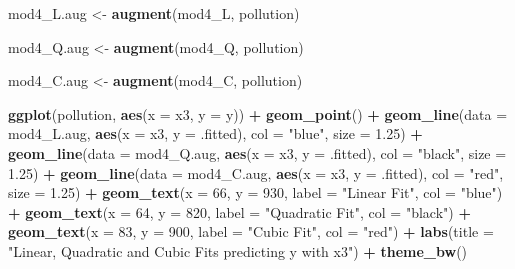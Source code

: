 \documentclass[]{book}
\newenvironment{Shaded}{\begin{snugshade}}{\end{snugshade}}
\newcommand{\KeywordTok}[1]{\textcolor[rgb]{0.13,0.29,0.53}{\textbf{#1}}}
\newcommand{\DataTypeTok}[1]{\textcolor[rgb]{0.13,0.29,0.53}{#1}}
\newcommand{\DecValTok}[1]{\textcolor[rgb]{0.00,0.00,0.81}{#1}}
\newcommand{\FloatTok}[1]{\textcolor[rgb]{0.00,0.00,0.81}{#1}}
\newcommand{\StringTok}[1]{\textcolor[rgb]{0.31,0.60,0.02}{#1}}
\newcommand{\OperatorTok}[1]{\textcolor[rgb]{0.81,0.36,0.00}{\textbf{#1}}}
\newcommand{\NormalTok}[1]{#1}
\theoremstyle{definition}
\theoremstyle{definition}
\theoremstyle{definition}
\theoremstyle{remark}
\begin{document}
\begin{Shaded}
\begin{Highlighting}[]
\NormalTok{mod4_L.aug <-}\StringTok{ }\KeywordTok{augment}\NormalTok{(mod4_L, pollution)}

\NormalTok{mod4_Q.aug <-}\StringTok{ }\KeywordTok{augment}\NormalTok{(mod4_Q, pollution)}

\NormalTok{mod4_C.aug <-}\StringTok{ }\KeywordTok{augment}\NormalTok{(mod4_C, pollution)}

\KeywordTok{ggplot}\NormalTok{(pollution, }\KeywordTok{aes}\NormalTok{(}\DataTypeTok{x =}\NormalTok{ x3, }\DataTypeTok{y =}\NormalTok{ y)) }\OperatorTok{+}
\StringTok{    }\KeywordTok{geom_point}\NormalTok{() }\OperatorTok{+}
\StringTok{    }\KeywordTok{geom_line}\NormalTok{(}\DataTypeTok{data =}\NormalTok{ mod4_L.aug, }\KeywordTok{aes}\NormalTok{(}\DataTypeTok{x =}\NormalTok{ x3, }\DataTypeTok{y =}\NormalTok{ .fitted), }
              \DataTypeTok{col =} \StringTok{"blue"}\NormalTok{, }\DataTypeTok{size =} \FloatTok{1.25}\NormalTok{) }\OperatorTok{+}
\StringTok{    }\KeywordTok{geom_line}\NormalTok{(}\DataTypeTok{data =}\NormalTok{ mod4_Q.aug, }\KeywordTok{aes}\NormalTok{(}\DataTypeTok{x =}\NormalTok{ x3, }\DataTypeTok{y =}\NormalTok{ .fitted),}
              \DataTypeTok{col =} \StringTok{"black"}\NormalTok{, }\DataTypeTok{size =} \FloatTok{1.25}\NormalTok{) }\OperatorTok{+}
\StringTok{    }\KeywordTok{geom_line}\NormalTok{(}\DataTypeTok{data =}\NormalTok{ mod4_C.aug, }\KeywordTok{aes}\NormalTok{(}\DataTypeTok{x =}\NormalTok{ x3, }\DataTypeTok{y =}\NormalTok{ .fitted),}
              \DataTypeTok{col =} \StringTok{"red"}\NormalTok{, }\DataTypeTok{size =} \FloatTok{1.25}\NormalTok{) }\OperatorTok{+}
\StringTok{    }\KeywordTok{geom_text}\NormalTok{(}\DataTypeTok{x =} \DecValTok{66}\NormalTok{, }\DataTypeTok{y =} \DecValTok{930}\NormalTok{, }\DataTypeTok{label =} \StringTok{"Linear Fit"}\NormalTok{, }\DataTypeTok{col =} \StringTok{"blue"}\NormalTok{) }\OperatorTok{+}
\StringTok{    }\KeywordTok{geom_text}\NormalTok{(}\DataTypeTok{x =} \DecValTok{64}\NormalTok{, }\DataTypeTok{y =} \DecValTok{820}\NormalTok{, }\DataTypeTok{label =} \StringTok{"Quadratic Fit"}\NormalTok{, }\DataTypeTok{col =} \StringTok{"black"}\NormalTok{) }\OperatorTok{+}
\StringTok{    }\KeywordTok{geom_text}\NormalTok{(}\DataTypeTok{x =} \DecValTok{83}\NormalTok{, }\DataTypeTok{y =} \DecValTok{900}\NormalTok{, }\DataTypeTok{label =} \StringTok{"Cubic Fit"}\NormalTok{, }\DataTypeTok{col =} \StringTok{"red"}\NormalTok{) }\OperatorTok{+}
\StringTok{    }\KeywordTok{labs}\NormalTok{(}\DataTypeTok{title =} \StringTok{"Linear, Quadratic and Cubic Fits predicting y with x3"}\NormalTok{) }\OperatorTok{+}
\StringTok{    }\KeywordTok{theme_bw}\NormalTok{()}
\end{Highlighting}
\end{Shaded}
\end{document}
